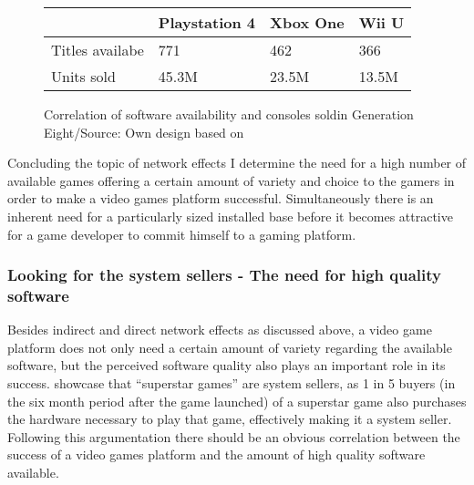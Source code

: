 \documentclass
[
    a4paper,
    11pt
]
{article}
\begin{document}
\begin{figure}[ht!]
    \centering
    \small
    \begin{tabular}{l l l l}
      \hline
                        		 & Playstation 4& Xbox One  & Wii U \\ \hline \hline
            Titles availabe  	 & 771          & 462       & 366    \\
            Units sold		     & 45.3M        & 23.5M    & 13.5M \\ \hline
    \end{tabular}
    \caption{Correlation of software availability and consoles soldin Generation Eight/Source: Own design based on \cite{Vgchartz.com2016}}
    \label{tab:gen8sales}
\end{figure}

Concluding the topic of network effects I determine the need for a high number of
available games offering a certain amount of variety and choice to the gamers in order
to make a video games platform successful. Simultaneously there is an inherent need
for a particularly sized installed base before it becomes attractive for a game developer
to commit himself to a gaming platform.
%
\subsubsection{Looking for the system sellers - The need for high quality software}
\label{looking-for-the-system-sellers}
%
Besides indirect and direct network effects as discussed above, a video game
platform does not only need a certain amount of variety regarding the available software, but the perceived software quality also plays an important role in its success. \cite{Binken2009} showcase that ``superstar games'' are system sellers, as 1 in 5 buyers (in the six month period after the game launched) of a superstar game also purchases the hardware necessary to play that game, effectively making it a system seller. Following this argumentation there should be an obvious correlation between the success of a video games platform and the amount of high quality software available.
\end{document}
